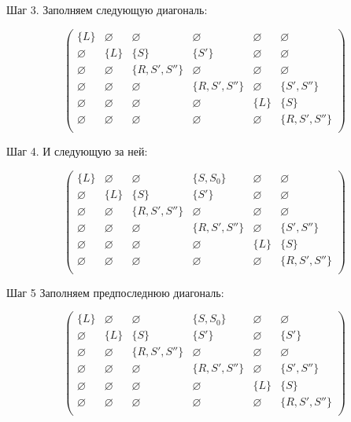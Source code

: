 \begin{example}
Шаг 3. Заполняем следующую диагональ:

\[
\begin{pmatrix}
\{L\}  		& \varnothing & \varnothing    & \varnothing 	  & \varnothing & \varnothing 	 \\
\varnothing & \{L\} 	  & \{S\}  		   & \{S'\}  		  & \varnothing & \varnothing 	 \\
\varnothing & \varnothing & \{R, S', S''\} & \varnothing 	  & \varnothing & \varnothing 	 \\
\varnothing & \varnothing & \varnothing    & \{R, S', S''\}   & \varnothing & \{S', S''\}	 \\
\varnothing & \varnothing & \varnothing    & \varnothing 	  & \{L\} 	    & \{S\}	 		 \\
\varnothing & \varnothing & \varnothing    & \varnothing 	  & \varnothing & \{R, S', S''\} \\
\end{pmatrix}
\]

Шаг 4. И следующую за ней:

\[
\begin{pmatrix}
\{L\}  		& \varnothing & \varnothing    & \{S, S_0\}	 	  & \varnothing & \varnothing 	 \\
\varnothing & \{L\} 	  & \{S\}  		   & \{S'\}  		  & \varnothing & \varnothing 	 \\
\varnothing & \varnothing & \{R, S', S''\} & \varnothing 	  & \varnothing & \varnothing 	 \\
\varnothing & \varnothing & \varnothing    & \{R, S', S''\}   & \varnothing & \{S', S''\}	 \\
\varnothing & \varnothing & \varnothing    & \varnothing 	  & \{L\} 	    & \{S\}	 		 \\
\varnothing & \varnothing & \varnothing    & \varnothing 	  & \varnothing & \{R, S', S''\} \\
\end{pmatrix}
\]

Шаг 5 Заполняем предпоследнюю диагональ:

\[
\begin{pmatrix}
\{L\}  		& \varnothing & \varnothing    & \{S, S_0\}	 	  & \varnothing & \varnothing 	 \\
\varnothing & \{L\} 	  & \{S\}  		   & \{S'\}  		  & \varnothing & \{S'\}	 	 \\
\varnothing & \varnothing & \{R, S', S''\} & \varnothing 	  & \varnothing & \varnothing 	 \\
\varnothing & \varnothing & \varnothing    & \{R, S', S''\}   & \varnothing & \{S', S''\}	 \\
\varnothing & \varnothing & \varnothing    & \varnothing 	  & \{L\} 	    & \{S\}	 		 \\
\varnothing & \varnothing & \varnothing    & \varnothing 	  & \varnothing & \{R, S', S''\} \\
\end{pmatrix}
\]


\end{example}
